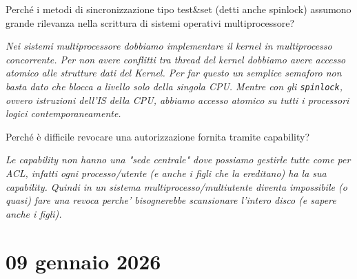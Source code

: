 \documentclass[a4paper,12pt]{article}
\newcommand{\datasection}[1]{%
    \section*{#1}%
    \addcontentsline{toc}{section}{#1}%
}
\newenvironment{exambox}{%
    \begin{mdframed}[
        linecolor=black!70,
        linewidth=0.6pt,
        innerleftmargin=8pt,
        innerrightmargin=8pt,
        innertopmargin=6pt,
        innerbottommargin=6pt
    ]
    \begin{description}
}{%
    \end{description}
    \end{mdframed}
}
\begin{document}
\begin{exambox}
\begin{center}
\begin{tikzpicture}[
  proc/.style={circle, draw, minimum size=1cm, thick},
  res/.style={rectangle, draw, minimum size=1cm, thick},
  >=Stealth, thick
]
\end{tikzpicture}
  \end{center}
  \item[c)] Perché i metodi di sincronizzazione tipo test\&set (detti anche spinlock) assumono grande rilevanza nella
scrittura di sistemi operativi multiprocessore?
  \item[R:] \textit{Nei sistemi multiprocessore dobbiamo implementare il kernel in multiprocesso concorrente. Per non avere conflitti tra thread del kernel dobbiamo avere accesso atomico alle strutture dati del Kernel. Per far questo un semplice semaforo non basta dato che blocca a livello solo della singola CPU. Mentre con gli \texttt{spinlock}, ovvero istruzioni dell'IS della CPU, abbiamo accesso atomico su tutti i processori logici contemporaneamente.}
  \label{risposta:spinlock}
  \item[d)] Perché è difficile revocare una autorizzazione fornita tramite capability?
  \item[R:] \textit{Le capability non hanno una "sede centrale" dove possiamo gestirle tutte come per ACL, infatti ogni processo/utente (e anche i figli che la ereditano) ha la sua capability. Quindi in un sistema multiprocesso/multiutente diventa impossibile (o quasi) fare una revoca perche' bisognerebbe scansionare l'intero disco (e sapere anche i figli).}
\end{exambox}
\newpage
\datasection{09 gennaio 2026}
\end{document}
